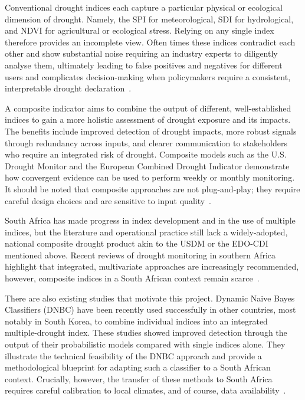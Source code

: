 Conventional drought indices each capture a particular physical or ecological dimension of drought. Namely, the SPI for meteorological, SDI for hydrological, and NDVI for agricultural or ecological stress. Relying on any single index therefore provides an incomplete view. Often times these indices contradict each other and show substantial noise requiring an industry experts to diligently analyse them, ultimately leading to false positives and negatives for different users and complicates decision-making when policymakers require a consistent, interpretable drought declaration~\cite{NCEI_2024}.

A composite indicator aims to combine the output of different, well-established indices to gain a more holistic assessment of drought exposure and its impacts. The benefits include improved detection of drought impacts, more robust signals through redundancy across inputs, and clearer communication to stakeholders who require an integrated risk of drought. Composite models such as the U.S. Drought Monitor and the European Combined Drought Indicator demonstrate how convergent evidence can be used to perform weekly or monthly monitoring. It should be noted that composite approaches are not plug-and-play; they require careful design choices and are sensitive to input quality~\cite{usdm,cdi,some_comp_indicator}.


South Africa has made progress in index development and in the use of multiple indices, but the literature and operational practice still lack a widely-adopted, national composite drought product akin to the USDM or the EDO-CDI mentioned above. Recent reviews of drought monitoring in southern Africa highlight that integrated, multivariate approaches are increasingly recommended, however, composite indices in a South African context remain scarce~\cite{za_drought_review, za_drought_review2}. 

There are also existing studies that motivate this project. Dynamic Naive Bayes Classifiers (DNBC) have been recently used successfully in other countries, most notably in South Korea, to combine individual indices into an integrated multiple-drought index. These studies showed improved detection through the output of their probabilistic models compared with single indices alone. They illustrate the technical feasibility of the DNBC approach and provide a methodological blueprint for adapting such a classifier to a South African context. Crucially, however, the transfer of these methods to South Africa requires careful calibration to local climates, and of course, data availability~\cite{dnbc_drought_second, dnbc_drought_first}.



